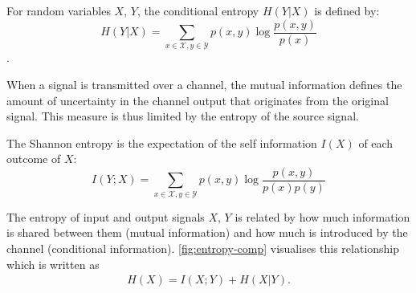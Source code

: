 



\begin{definition}
For random variables $X$, $Y$, the conditional entropy $H(Y|X)$ is defined by:
\begin{equation}
    H(Y|X) = \sum_{x\in\mathcal{X}, y\in\mathcal{Y}} p(x, y)\log\frac{p(x, y)}{p(x)}
\end{equation}.
\end{definition}

When a signal is transmitted over a channel, the mutual information defines the amount of uncertainty in the channel output that originates from the original signal. This measure is thus limited by the entropy of the source signal.

\begin{definition}
The Shannon entropy is the expectation of the self information $I(X)$ of each outcome of $X$:
\begin{equation}
    I(Y;X) = \sum_{x\in\mathcal{X}, y\in\mathcal{Y}} p(x, y)\log\frac{p(x, y)}{p(x)p(y)}
\end{equation}
\end{definition}

The entropy of input and output signals $X$, $Y$ is related by how much information is shared between them (mutual information) and how much is introduced by the channel (conditional information). \cref{fig:entropy-comp} visualises this relationship which is written as
\begin{align}\label{eq:entropy-law}
    H(X) = I(X;Y)+H(X|Y).
\end{align}

